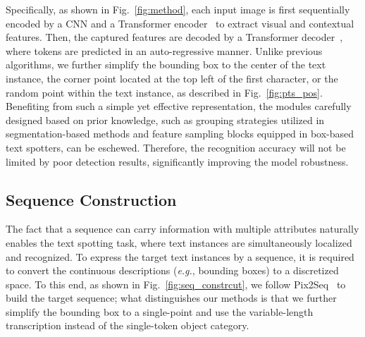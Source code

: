 \documentclass[sigconf]{acmart}
\begin{document}
Specifically, as shown in Fig.~\ref{fig:method}, each input image is first sequentially encoded by a CNN and a Transformer encoder~\cite{vaswani2017attention} to extract visual and contextual features. Then, the captured features are decoded by a Transformer decoder~\cite{vaswani2017attention}, where tokens are predicted in an auto-regressive manner. Unlike previous algorithms, we further simplify the bounding box to the center of the text instance, the corner point located at the top left of the first character, or the random point within the text instance, as described in Fig.~\ref{fig:pts_pos}. Benefiting from such a simple yet effective representation, the modules carefully designed based on prior knowledge, such as grouping strategies utilized in segmentation-based methods and feature sampling blocks equipped in box-based text spotters, can be eschewed. Therefore, the recognition accuracy will not be limited by poor detection results, significantly improving the model robustness.


\subsection{Sequence Construction}
\label{sec:seq construction}
The fact that a sequence can carry information with multiple attributes naturally enables the text spotting task, where text instances are simultaneously localized and recognized. To express the target text instances by a sequence, it is required to convert the continuous descriptions (\emph{e.g.}, bounding boxes) to a discretized space. To this end, as shown in Fig.~\ref{fig:seq_constrcut}, we follow Pix2Seq~\cite{chen2021pix2seq} to build the target sequence; what distinguishes our methods is that we further simplify the bounding box to a single-point and use the variable-length transcription instead of the single-token object category. 
\end{document}

